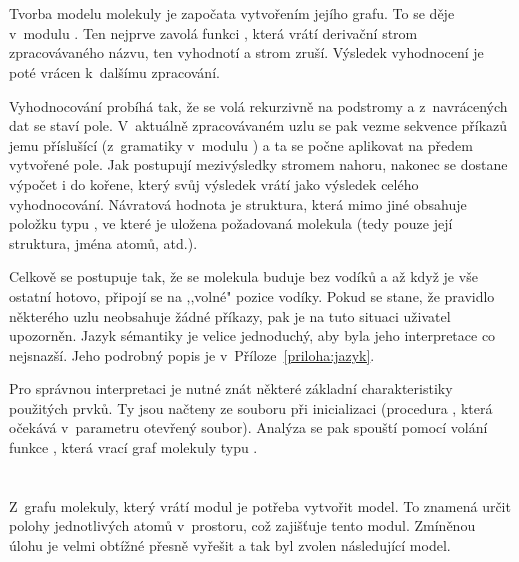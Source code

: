 \section{}
Tvorba modelu molekuly je započata vytvořením jejího grafu. To se děje v~modulu
. Ten nejprve zavolá funkci , která vrátí
de\-ri\-vač\-ní strom zpracovávaného názvu, ten vyhodnotí a strom zruší. Výsledek
vyhodnocení je poté vrácen k~dalšímu zpracování.

Vyhodnocování probíhá tak, že se volá rekurzivně na podstromy a z~na\-vrá\-ce\-ných
dat se staví pole. V~aktuálně zpracovávaném uzlu se pak vezme sekvence příkazů
jemu příslušící (z~gramatiky v~modulu ) a ta se počne aplikovat na
předem vytvořené pole. Jak postupují mezivýsledky stromem nahoru, nakonec se
dostane výpočet i do kořene, který svůj výsledek vrátí jako výsledek celého
vyhodnocování. Návratová hodnota je struktura, která mimo jiné obsahuje položku
typu , ve které je uložena požadovaná molekula (tedy
pouze její struktura, jména atomů, atd.).

Celkově se postupuje tak, že se molekula buduje bez vodíků a až když je vše
ostatní hotovo, připojí se na ,,volné" pozice vodíky. Pokud se stane, že
pravidlo některého uzlu neobsahuje žádné příkazy, pak je na tuto situaci
uživatel upozorněn. Jazyk sémantiky je velice jednoduchý, aby byla jeho
interpretace co nejsnazší. Jeho podrobný popis je v~Příloze~\ref{priloha:jazyk}.

Pro správnou interpretaci je nutné znát některé základní charakteristiky
použitých prvků. Ty jsou načteny ze souboru  při inicializaci
(procedura , která očekává v~parametru otevřený
soubor). Analýza se pak spouští pomocí volání funkce ,
která vrací graf molekuly typu .

\section{}
Z~grafu molekuly, který vrátí modul  je potřeba vytvořit model.
To znamená určit polohy jednotlivých atomů v~prostoru, což zajišťuje tento
modul. Zmíněnou úlohu je velmi obtížné přesně vyřešit a tak byl zvolen
následující model.

